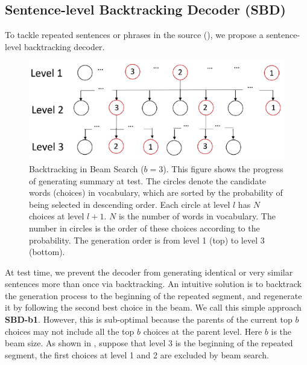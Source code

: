 \subsection{Sentence-level Backtracking Decoder (SBD)}
\label{sec:sbd}

To tackle repeated sentences or phrases in the source (), 
we propose a sentence-level backtracking decoder.

\begin{figure}[th]
    \centering
    \includegraphics[width=0.8\linewidth]{SBD}
    \caption{Backtracking in Beam Search ($b=3$). 
	    This figure shows the progress of generating summary at test. The circles denote the
		candidate words (choices) in vocabulary, 
		which are sorted by the probability of being selected in
		descending order. Each circle at level $l$ has $N$ choices 
		at level $l+1$. $N$ is the number of words in vocabulary. 
		The number in circles is the order of these choices according to the
		probability. The generation order is from level 1 (top) to level 3 (bottom).}
    \label{fig:beam}
\end{figure}

At test time, we prevent the decoder from generating identical or
very similar sentences more than once via backtracking. 
An intuitive solution is to backtrack the generation process to the beginning
of the repeated segment, and regenerate it by following the second best choice
in the beam. We call this simple approach \textbf{SBD-b1}.
However, this is sub-optimal
because the parents of the current top $b$ choices may not include all the top $b$ choices at the
parent level. Here $b$ is the beam size. As shown in , suppose that level 3 is the
beginning of the repeated segment, the first choices at level 1 and 2 are excluded by beam search. 

